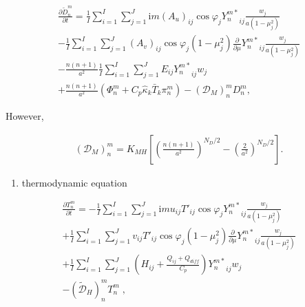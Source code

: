 \begin{eqnarray}
  \frac{\partial{\tilde{D}_n^m}}{\partial {t}}
   =  \frac{1}{I} \sum_{i=1}^{I} \sum_{j=1}^{J}  
          \mathrm{i}m (A_u)_{ij} \cos\varphi_j
          {Y_n^{m *}}_{ij}
         \frac{w_j}{a(1-\mu_j^{2})}
          \\
    -    \frac{1}{I} \sum_{i=1}^{I} \sum_{j=1}^{J}  
          (A_v)_{ij} \cos\varphi_j
          (1-\mu_j^2)
          \frac{\partial }{\partial \mu} {Y_n^{m *}}_{ij}
          \frac{w_j}{a(1-\mu_j^{2})}
          \\
    -   \frac{n(n+1)}{a^{2}}
         \frac{1}{I} \sum_{i=1}^{I} \sum_{j=1}^{J}  
          E_{ij} {Y_n^{m *}}_{ij} w_j
          \\
    +   \frac{n(n+1)}{a^{2}}
          ( \Phi_n^m + C_{p} \hat{\kappa}_k \bar{T}_k \pi_n^m )
          -  ({\mathcal D}_M)_n^m D_n^m  ,
\end{eqnarray}

However,

\begin{eqnarray}
({\mathcal D}_M)_n^m = K_{MH} \left[
                            \left( \frac{n(n+1)}{a^{2}} \right)^{N_D/2}
                            - \left( \frac{2}{a^2} \right)^{N_D/2}
                            \right]  .
\end{eqnarray}

\begin{enumerate}
\def\labelenumi{\arabic{enumi}.}
\setcounter{enumi}{2}
\tightlist
\item
  thermodynamic equation
\end{enumerate}

\begin{eqnarray}
  \frac{\partial{T_n^m}}{\partial {t}}
   =  - \frac{1}{I} \sum_{i=1}^{I} \sum_{j=1}^{J}  
          \mathrm{i}m u_{ij} T'_{ij} \cos\varphi_j
          {Y_n^{m *}}_{ij}
         \frac{w_j}{a(1-\mu_j^{2})}
          \\
     + \frac{1}{I} \sum_{i=1}^{I} \sum_{j=1}^{J}  
          v_{ij} T'_{ij} \cos\varphi_j
          (1-\mu_j^2)
          \frac{\partial }{\partial \mu} {Y_n^{m *}}_{ij}
          \frac{w_j}{a(1-\mu_j^{2})}
          \\
     + \frac{1}{I} \sum_{i=1}^{I} \sum_{j=1}^{J}  
          \left( H_{ij} + \frac{Q_{ij}+Q_{diff}}{C_{p}} \right)
          {Y_n^{m *}}_{ij} w_j
          \\
     - (\tilde{\mathcal D}_H)_n^m T_n^m \; ,
\end{eqnarray}

